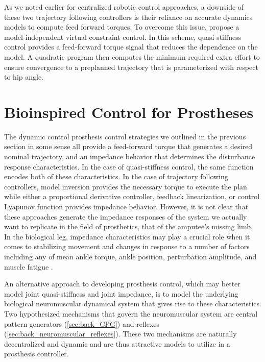 As we noted earlier for centralized robotic control approaches, a downside of
these two trajectory following controllers is their reliance on accurate
dynamics models to compute feed forward torques. To overcome this issue,
\citet{zhao2016first} propose a model-independent virtual constraint control. In
this scheme, quasi-stiffness control provides a feed-forward torque signal that
reduces the dependence on the model. A quadratic program then computes the
minimum required extra effort to ensure convergence to a preplanned trajectory
that is parameterized with respect to hip angle.

\section{Bioinspired Control for
Prostheses}\label{sec:back_bioinspired_pros_control} 

The dynamic control prosthesis control strategies we outlined in the previous
section in some sense all provide a feed-forward torque that generates a desired
nominal trajectory, and an impedance behavior that determines the disturbance
response characteristics. In the case of quasi-stiffness control, the same
function encodes both of these characteristics.  In the case of trajectory
following controllers, model inversion provides the necessary torque to execute
the plan while either a proportional derivative controller, feedback
linearization, or control Lyapunov function provides impedance behavior.
However, it is not clear that these approaches generate the impedance responses
of the system we actually want to replicate in the field of prosthetics, that of
the amputee's missing limb. In the biological leg, impedance characteristics may
play a crucial role when it comes to stabilizing movement
\citep{won1995stability, burdet2001central} and changes in response to a number
of factors including any of mean ankle torque, ankle position, perturbation
amplitude, and muscle fatigue \citep{kearney1989system}.

An alternative approach to developing prosthesis control, which may better model
joint quasi-stiffness and joint impedance, is to model the underlying biological
neuromuscular dynamical system that gives rise to these characteristics. Two
hypothesized mechanisms that govern the neuromuscular system are central pattern
generators (\cref{sec:back_CPG}) and reflexes
(\cref{sec:back_neuromuscular_reflexes}). These two mechanisms are naturally
decentralized and dynamic and are thus attractive models to utilize in a
prosthesis controller.

